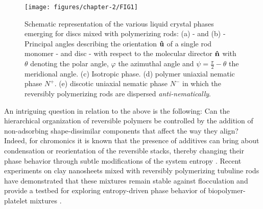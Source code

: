 \begin{figure}
  \texttt{[image: figures/chapter-2/FIG1]}
  \caption{Schematic representation of the various liquid crystal phases emerging for discs mixed with polymerizing rods: (a) - and (b) - Principal angles describing the orientation ${\bf \hat{u}}$ of a single rod monomer - and disc - with respect to the molecular director ${\bf \hat{n}}$  with $\theta$ denoting the polar angle, $\varphi$ the azimuthal angle and $\psi = \frac{\pi}{2} - \theta $ the meridional angle.  (c) Isotropic phase. (d) polymer uniaxial nematic phase $N^+$. (e) discotic uniaxial nematic phase $N^-$ in which the reversibly polymerizing rods are dispersed {\em anti-nematically}.}
  \label{fig:cartoon}
\end{figure}

An intriguing question in relation to the above is the following:  Can the hierarchical organization of reversible polymers be controlled by the addition of non-adsorbing shape-dissimilar components that affect the way they align? Indeed, for chromonics it is known that the presence of additives can bring about condensation or reorientation of the reversible stacks, thereby changing their phase behavior through subtle modifications of the system entropy \cite{tortora2010}.  Recent experiments on  clay nanosheets mixed with reversibly polymerizing tubuline rods have demonstrated that these mixtures remain stable against flocculation and provide a testbed for exploring entropy-driven phase behavior of biopolymer-platelet mixtures \cite{kato2018}.

